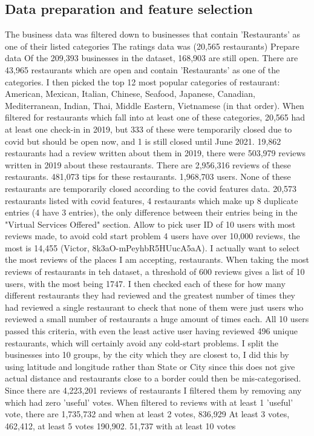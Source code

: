 \documentclass[conference]{IEEEtran}
\begin{document}
\subsection{Data preparation and feature selection}
The business data was filtered down to businesses that contain 'Restaurants' as one of their listed 
categories
The ratings data was 
(20,565 restaurants)
Prepare data
Of the 209,393 businesses in the dataset, 168,903 are still open. 
There are 43,965 restaurants which are open and contain 'Restaurants' as one of the categories. 
I then picked the top 12 most popular categories of restaurant: American, Mexican, Italian, Chinese, 
Seafood, Japanese, Canadian, Mediterranean, Indian, Thai, Middle Eastern, Vietnamese (in that order). 
When filtered for restaurants which fall into at least one of these categories, 
20,565 had at least one check-in in 2019, but 333 of these were temporarily closed due to covid but should be 
open now, and 1 is still closed until June 2021. 
19,862 restaurants had a review written about them in 2019, there were 503,979 reviews written in 2019 about these restaurants. 
There are 2,956,316 reviews of these restaurants. 
481,073 tips for these restaurants. 
1,968,703 users. 
None of these restaurants are temporarily closed according to the covid features data. 
20,573 restaurants listed with covid features, 4 restaurants which make up 8 duplicate entries 
(4 have 3 entries), the only difference between their entries being in the 
"Virtual Services Offered" section. 
Allow to pick user ID of 10 users with most reviews made, to avoid cold start problem
4 users have over 10,000 reviews, the most is 14,455 (Victor, 8k3aO-mPeyhbR5HUucA5aA). 
I actually want to select the most reviews of the places I am accepting, restaurants. 
When taking the most reviews of restaurants in teh dataset, a threshold of 600 reviews gives a list of 10 users, 
with the most being 1747. 
I then checked each of these for how many different restaurants they had reviewed and the greatest number of times 
they had reviewed a single restaurant to check that none of them were just users who reviewed a small number of 
restaurants a huge amount of times each. 
All 10 users passed this criteria, with even the least active user having reviewed 496 unique restaurants, which will 
certainly avoid any cold-start problems. 
I split the businesses into 10 groups, by the city which they are closest to, I did this by using latitude and 
longitude rather than State or City since this does not give actual distance and restaurants close to a border 
could then be mis-categorised. 
Since there are 4,223,201 reviews of restaurants I filtered them by removing any which had zero 'useful' votes. 
When filtered to reviews with at least 1 'useful' vote, there are 1,735,732 and when at least 2 votes, 836,929
At least 3 votes, 462,412, at least 5 votes 190,902. 
51,737 with at least 10 votes
\end{document}
